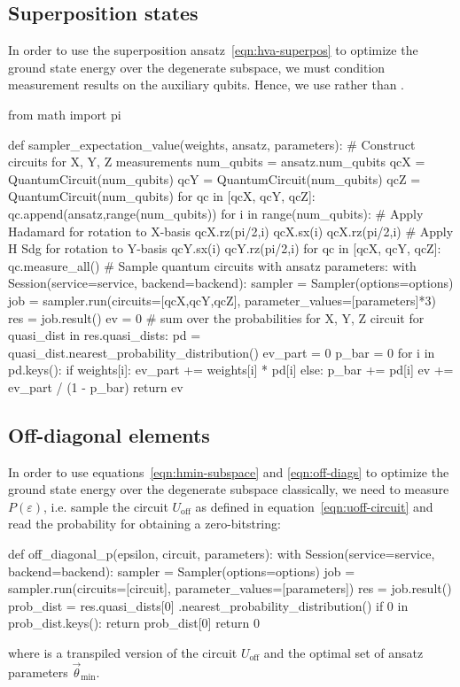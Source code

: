 \documentclass[a4paper,12pt]{article}
\begin{document}
\subsection{Superposition states}
In order to use the superposition ansatz~\eqref{eqn:hva-superpos} to optimize the ground state energy over the degenerate subspace, we must condition measurement results on the auxiliary qubits. Hence, we use  rather than .

\begin{python}
from math import pi

def sampler_expectation_value(weights, ansatz, parameters):
    # Construct circuits for X, Y, Z measurements
    num_qubits = ansatz.num_qubits
    qcX = QuantumCircuit(num_qubits)
    qcY = QuantumCircuit(num_qubits)
    qcZ = QuantumCircuit(num_qubits)
    for qc in [qcX, qcY, qcZ]:
        qc.append(ansatz,range(num_qubits))
    for i in range(num_qubits):
        # Apply Hadamard for rotation to X-basis
        qcX.rz(pi/2,i)
        qcX.sx(i)
        qcX.rz(pi/2,i)
        # Apply H Sdg for rotation to Y-basis
        qcY.sx(i)
        qcY.rz(pi/2,i)
    for qc in [qcX, qcY, qcZ]:
        qc.measure_all()
    # Sample quantum circuits with ansatz parameters:
    with Session(service=service, backend=backend):
        sampler = Sampler(options=options)
        job = sampler.run(circuits=[qcX,qcY,qcZ], 
                          parameter_values=[parameters]*3)
        res = job.result()
    ev = 0
    # sum over the probabilities for X, Y, Z circuit
    for quasi_dist in res.quasi_dists:
        pd = quasi_dist.nearest_probability_distribution()
        ev_part = 0
        p_bar = 0
        for i in pd.keys():
            if weights[i]:
                ev_part += weights[i] * pd[i]
            else:
                p_bar += pd[i]
        ev += ev_part / (1 - p_bar)
    return ev
\end{python}




\subsection{Off-diagonal elements}
In order to use equations~\eqref{eqn:hmin-subspace} and \eqref{eqn:off-diags} to optimize the ground state energy over the degenerate subspace classically, we need to measure $P(\varepsilon)$, i.e. sample the circuit $U_\text{off}$ as defined in equation~\eqref{eqn:uoff-circuit} and read the probability for obtaining a zero-bitstring:
\begin{python}
def off_diagonal_p(epsilon, circuit, parameters):
    with Session(service=service, backend=backend):
        sampler = Sampler(options=options)
        job = sampler.run(circuits=[circuit],
                          parameter_values=[parameters])
        res = job.result()
    prob_dist = res.quasi_dists[0]
                .nearest_probability_distribution()
    if 0 in prob_dist.keys():
        return prob_dist[0]
    return 0
\end{python}
where  is a transpiled version of the circuit $U_\text{off}$ and  the optimal set of ansatz parameters $\vec\theta_\text{min}$.
\end{document}
